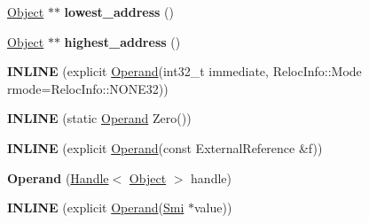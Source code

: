 \begin{DoxyCompactItemize}
\item 
\hyperlink{classv8_1_1internal_1_1_object}{Object} $\ast$$\ast$ {\bfseries lowest\+\_\+address} ()\hypertarget{classv8_1_1internal_1_1_b_a_s_e___e_m_b_e_d_d_e_d_a4986f095912dd9059031e7e49e62ea6f}{}\label{classv8_1_1internal_1_1_b_a_s_e___e_m_b_e_d_d_e_d_a4986f095912dd9059031e7e49e62ea6f}

\item 
\hyperlink{classv8_1_1internal_1_1_object}{Object} $\ast$$\ast$ {\bfseries highest\+\_\+address} ()\hypertarget{classv8_1_1internal_1_1_b_a_s_e___e_m_b_e_d_d_e_d_a6132f97e493d3ee756bebfb08e96f387}{}\label{classv8_1_1internal_1_1_b_a_s_e___e_m_b_e_d_d_e_d_a6132f97e493d3ee756bebfb08e96f387}

\item 
{\bfseries I\+N\+L\+I\+NE} (explicit \hyperlink{classv8_1_1internal_1_1_operand}{Operand}(int32\+\_\+t immediate,                           Reloc\+Info\+::\+Mode rmode=Reloc\+Info\+::\+N\+O\+N\+E32))\hypertarget{classv8_1_1internal_1_1_b_a_s_e___e_m_b_e_d_d_e_d_a2715aaa79413195839e60721e4c0a587}{}\label{classv8_1_1internal_1_1_b_a_s_e___e_m_b_e_d_d_e_d_a2715aaa79413195839e60721e4c0a587}

\item 
{\bfseries I\+N\+L\+I\+NE} (static \hyperlink{classv8_1_1internal_1_1_operand}{Operand} Zero())\hypertarget{classv8_1_1internal_1_1_b_a_s_e___e_m_b_e_d_d_e_d_af3515fc7100ada6639a823b5e7a078b0}{}\label{classv8_1_1internal_1_1_b_a_s_e___e_m_b_e_d_d_e_d_af3515fc7100ada6639a823b5e7a078b0}

\item 
{\bfseries I\+N\+L\+I\+NE} (explicit \hyperlink{classv8_1_1internal_1_1_operand}{Operand}(const External\+Reference \&f))\hypertarget{classv8_1_1internal_1_1_b_a_s_e___e_m_b_e_d_d_e_d_a5a7a275240d4134c48a50f3f58fbc6e9}{}\label{classv8_1_1internal_1_1_b_a_s_e___e_m_b_e_d_d_e_d_a5a7a275240d4134c48a50f3f58fbc6e9}

\item 
{\bfseries Operand} (\hyperlink{classv8_1_1internal_1_1_handle}{Handle}$<$ \hyperlink{classv8_1_1internal_1_1_object}{Object} $>$ handle)\hypertarget{classv8_1_1internal_1_1_b_a_s_e___e_m_b_e_d_d_e_d_ac0a960c31fb67bf909833310bf361508}{}\label{classv8_1_1internal_1_1_b_a_s_e___e_m_b_e_d_d_e_d_ac0a960c31fb67bf909833310bf361508}

\item 
{\bfseries I\+N\+L\+I\+NE} (explicit \hyperlink{classv8_1_1internal_1_1_operand}{Operand}(\hyperlink{classv8_1_1internal_1_1_smi}{Smi} $\ast$value))\hypertarget{classv8_1_1internal_1_1_b_a_s_e___e_m_b_e_d_d_e_d_a167180552d3855f80f886be1fcfefaaa}{}\label{classv8_1_1internal_1_1_b_a_s_e___e_m_b_e_d_d_e_d_a167180552d3855f80f886be1fcfefaaa}


\end{DoxyCompactItemize}
